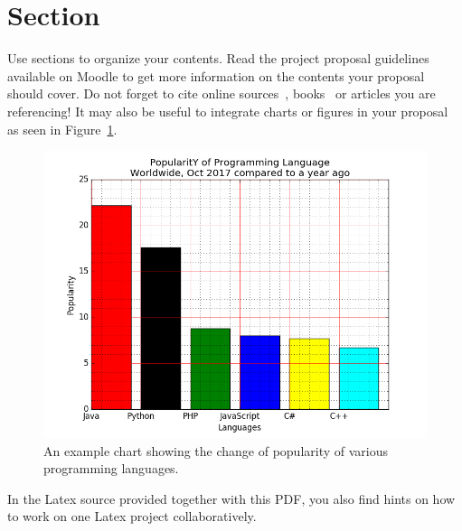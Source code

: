 \documentclass[
     12pt,         %
     a4paper,      %
     BCOR10mm,     %
     DIV14,        %
     ]{article}
\begin{document}


%



\section{Section}

Use sections to organize your contents. Read the project proposal guidelines available on Moodle to get more information on the contents your proposal should cover. Do not forget to cite online sources~\cite{WFR2017}, books~\cite{goldberg2017neural} or articles you are referencing! It may also be useful to integrate charts or figures in your proposal as seen in Figure~\ref{fig:example}.

\begin{figure}[h]
  \centering
  \includegraphics[scale=0.3]{figures/example_barchart}
  \caption[]{An example chart showing the change of popularity of various programming languages\footnotemark[1].}
  \label{fig:example}
\end{figure}


In the Latex source provided together with this PDF, you also find hints on how to work on one Latex project collaboratively.



\end{document}
